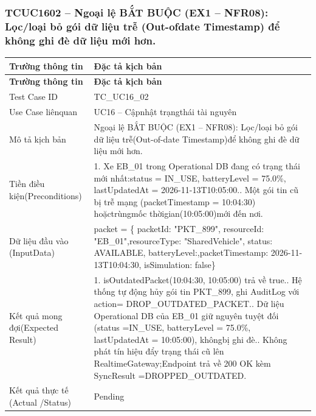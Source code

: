 \subsubsection{TCUC1602 – Ngoại lệ BẮT BUỘC (EX1 – NFR08): Lọc/loại bỏ gói dữ liệu trễ (Out-ofdate Timestamp) để không ghi đè dữ liệu mới hơn.}
\begin{longtable}{|L{0.24\textwidth}|L{0.70\textwidth}|}
\hline
\textbf{Trường thông tin} & \textbf{Đặc tả kịch bản} \\
\hline
\endfirsthead
\hline
\textbf{Trường thông tin} & \textbf{Đặc tả kịch bản} \\
\hline
\endhead
Test Case ID & TC\_UC16\_02 \\
\hline
Use Case liênquan & UC16 – Cậpnhật trạngthái tài nguyên \\
\hline
Mô tả kịch bản & Ngoại lệ BẮT BUỘC (EX1 – NFR08): Lọc/loại bỏ gói dữ liệu trễ\newline (Out-of-date Timestamp)để không ghi đè dữ liệu mới hơn. \\
\hline
Tiền điều kiện\newline (Preconditions) & 1. Xe EB\_01 trong Operational DB đang có trạng thái mới nhất:\newline status = IN\_USE, batteryLevel = 75.0\%, lastUpdatedAt = 2026-11-\newline 13T10:05:00.. Một gói tin cũ bị trễ mạng (packetTimestamp = 10:04:30) hoặc\newline trùngmốc thờigian(10:05:00)mới đến nơi. \\
\hline
Dữ liệu đầu vào (Input\newline Data) & packet = \{ packetId: "PKT\_899", resourceId: "EB\_01",\newline resourceType: "SharedVehicle", status: AVAILABLE, batteryLevel:,packetTimestamp: 2026-11-13T10:04:30, isSimulation: false\} \\
\hline
Kết quả mong đợi\newline (Expected Result) & 1. isOutdatedPacket(10:04:30, 10:05:00) trả về true.. Hệ thống tự động hủy gói tin PKT\_899, ghi AuditLog với action\newline = DROP\_OUTDATED\_PACKET.. Dữ liệu Operational DB của EB\_01 giữ nguyên tuyệt đối (status =\newline IN\_USE, batteryLevel = 75.0\%, lastUpdatedAt = 10:05:00), không\newline bị ghi đè.. Không phát tín hiệu đẩy trạng thái cũ lên RealtimeGateway;\newline Endpoint trả về 200 OK kèm SyncResult =\newline DROPPED\_OUTDATED. \\
\hline
Kết quả thực tế (Actual /\newline Status) & Pending \\
\hline
\end{longtable}
\vspace{-0.5\baselineskip}
